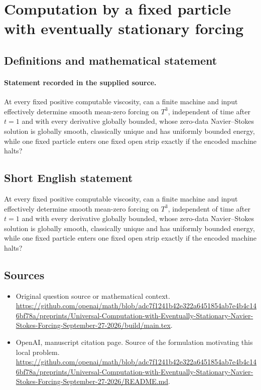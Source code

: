 \documentclass[11pt]{article}
\begin{document}
\section*{Computation by a fixed particle with eventually stationary forcing}\label{30007321}
\subsection{Definitions and mathematical statement}
\paragraph{Statement recorded in the supplied source.}
At every fixed positive computable viscosity, can a finite machine and input effectively determine smooth mean-zero forcing on $T^3$, independent of time after $t=1$ and with every derivative globally bounded, whose zero-data Navier–Stokes solution is globally smooth, classically unique and has uniformly bounded energy, while one fixed particle enters one fixed open strip exactly if the encoded machine halts?
\subsection{Short English statement}
At every fixed positive computable viscosity, can a finite machine and input effectively determine smooth mean-zero forcing on $T^3$, independent of time after $t=1$ and with every derivative globally bounded, whose zero-data Navier–Stokes solution is globally smooth, classically unique and has uniformly bounded energy, while one fixed particle enters one fixed open strip exactly if the encoded machine halts?
\subsection{Sources}
\begin{itemize}
\item[S1] Original question source or mathematical context.
\url{https://github.com/openai/math/blob/adc7f1241b42e322a6451854ab7e4b4c146bf78a/preprints/Universal-Computation-with-Eventually-Stationary-Navier-Stokes-Forcing-September-27-2026/build/main.tex}.
\item[S2] OpenAI, manuscript citation page. Source of the formulation motivating this local problem.
\url{https://github.com/openai/math/blob/adc7f1241b42e322a6451854ab7e4b4c146bf78a/preprints/Universal-Computation-with-Eventually-Stationary-Navier-Stokes-Forcing-September-27-2026/README.md}.
\end{itemize}
\end{document}
